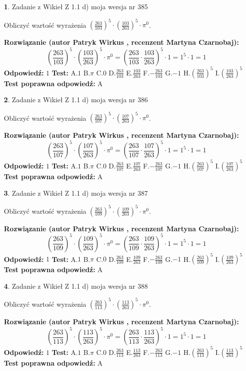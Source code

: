 \documentclass[12pt, a4paper]{article}
\theoremstyle{definition} %
\newtheorem{zad}{}
\newcommand{\zadStart}[1]{\begin{zad}#1\newline}
\newcommand{\zadStop}{\end{zad}}
\newcommand{\rozwStart}[2]{\noindent \textbf{Rozwiązanie (autor #1 , recenzent #2): }\newline}
\newcommand{\rozwStop}{\newline}
\newcommand{\odpStart}{\noindent \textbf{Odpowiedź:}\newline}
\newcommand{\odpStop}{\newline}
\newcommand{\testStart}{\noindent \textbf{Test:}\newline}
\newcommand{\testStop}{\newline}
\newcommand{\kluczStart}{\noindent \textbf{Test poprawna odpowiedź:}\newline}
\newcommand{\kluczStop}{\newline}
\begin{document}
\zadStart{Zadanie z Wikieł Z 1.1 d) moja wersja nr 385}

Obliczyć wartość wyrażenia $(\frac{263}{103})^{5} \cdot (\frac{103}{263})^{5} \cdot \pi^{0}$.
\zadStop
\rozwStart{Patryk Wirkus}{Martyna Czarnobaj}
$$(\frac{263}{103})^{5} \cdot (\frac{103}{263})^{5} \cdot \pi^{0} = (\frac{263}{103} \cdot \frac{103}{263})^{5} \cdot 1 = 1^{5} \cdot 1 = 1$$
\rozwStop
\odpStart
$1$
\odpStop
\testStart
A.$1$ B.$\pi$ C.$0$ D.$\frac{263}{103}$ E.$\frac{103}{263}$
F.$-\frac{263}{103}$ G.$-1$
H.$(\frac{263}{103})^{5}$
I.$(\frac{103}{263})^{5}$
\testStop
\kluczStart
A
\kluczStop



\zadStart{Zadanie z Wikieł Z 1.1 d) moja wersja nr 386}

Obliczyć wartość wyrażenia $(\frac{263}{107})^{5} \cdot (\frac{107}{263})^{5} \cdot \pi^{0}$.
\zadStop
\rozwStart{Patryk Wirkus}{Martyna Czarnobaj}
$$(\frac{263}{107})^{5} \cdot (\frac{107}{263})^{5} \cdot \pi^{0} = (\frac{263}{107} \cdot \frac{107}{263})^{5} \cdot 1 = 1^{5} \cdot 1 = 1$$
\rozwStop
\odpStart
$1$
\odpStop
\testStart
A.$1$ B.$\pi$ C.$0$ D.$\frac{263}{107}$ E.$\frac{107}{263}$
F.$-\frac{263}{107}$ G.$-1$
H.$(\frac{263}{107})^{5}$
I.$(\frac{107}{263})^{5}$
\testStop
\kluczStart
A
\kluczStop



\zadStart{Zadanie z Wikieł Z 1.1 d) moja wersja nr 387}

Obliczyć wartość wyrażenia $(\frac{263}{109})^{5} \cdot (\frac{109}{263})^{5} \cdot \pi^{0}$.
\zadStop
\rozwStart{Patryk Wirkus}{Martyna Czarnobaj}
$$(\frac{263}{109})^{5} \cdot (\frac{109}{263})^{5} \cdot \pi^{0} = (\frac{263}{109} \cdot \frac{109}{263})^{5} \cdot 1 = 1^{5} \cdot 1 = 1$$
\rozwStop
\odpStart
$1$
\odpStop
\testStart
A.$1$ B.$\pi$ C.$0$ D.$\frac{263}{109}$ E.$\frac{109}{263}$
F.$-\frac{263}{109}$ G.$-1$
H.$(\frac{263}{109})^{5}$
I.$(\frac{109}{263})^{5}$
\testStop
\kluczStart
A
\kluczStop



\zadStart{Zadanie z Wikieł Z 1.1 d) moja wersja nr 388}

Obliczyć wartość wyrażenia $(\frac{263}{113})^{5} \cdot (\frac{113}{263})^{5} \cdot \pi^{0}$.
\zadStop
\rozwStart{Patryk Wirkus}{Martyna Czarnobaj}
$$(\frac{263}{113})^{5} \cdot (\frac{113}{263})^{5} \cdot \pi^{0} = (\frac{263}{113} \cdot \frac{113}{263})^{5} \cdot 1 = 1^{5} \cdot 1 = 1$$
\rozwStop
\odpStart
$1$
\odpStop
\testStart
A.$1$ B.$\pi$ C.$0$ D.$\frac{263}{113}$ E.$\frac{113}{263}$
F.$-\frac{263}{113}$ G.$-1$
H.$(\frac{263}{113})^{5}$
I.$(\frac{113}{263})^{5}$
\testStop
\kluczStart
A
\kluczStop
\end{document}
